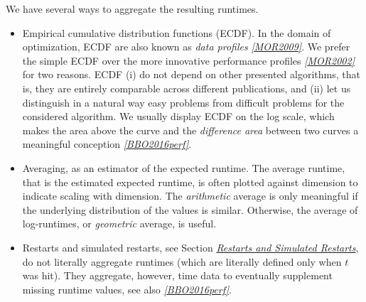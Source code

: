\documentclass[letterpaper,12pt,english]{article}
\begin{document}
We have several ways to aggregate the resulting runtimes.
\begin{itemize}
\item {} 
Empirical cumulative distribution functions (ECDF). In the domain of
optimization, ECDF are also known as \emph{data profiles} \label{index:id49}{\hyperref[index:mor2009]{\emph{{[}MOR2009{]}}}}. We
prefer the simple ECDF over the more innovative performance profiles
\label{index:id50}{\hyperref[index:mor2002]{\emph{{[}MOR2002{]}}}} for two reasons.
ECDF (i) do not depend on other presented algorithms, that is, they are
entirely comparable across different publications, and (ii) let us distinguish in a
natural way easy problems from difficult problems for the considered
algorithm. We usually display ECDF on the log scale, which makes the area
above the curve and the \emph{difference area} between two curves a meaningful
conception \label{index:id51}{\hyperref[index:bbo2016perf]{\emph{{[}BBO2016perf{]}}}}.

\item {} 
Averaging, as an estimator of the expected runtime. The average runtime, that
is the estimated expected runtime, is
often plotted against dimension to indicate scaling with dimension. The
\emph{arithmetic} average
is only meaningful if the underlying distribution of the values
is similar. Otherwise, the average of log-runtimes, or \emph{geometric} average,
is useful.

\item {} 
Restarts and simulated restarts, see Section {\hyperref[index:sec\string-restarts]{\emph{Restarts and Simulated Restarts}}}, do not
literally aggregate runtimes (which are literally defined only when \(t\) was
hit).  They aggregate, however, time data to eventually supplement missing runtime
values, see also \label{index:id52}{\hyperref[index:bbo2016perf]{\emph{{[}BBO2016perf{]}}}}.

\end{itemize}
\end{document}
